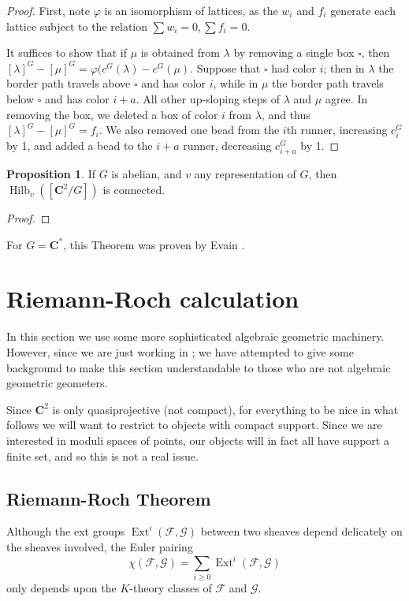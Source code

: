 \documentclass{amsart}[12pt]
\theoremstyle{definition}
\newtheorem{proposition}[dummy]{Proposition}
\newcommand{\C}{\mathbf{C}}
\DeclareMathOperator{\Hilb}{Hilb}
\DeclareMathOperator{\Ext}{Ext}
\begin{document}
\begin{proof}
First, note $\varphi$ is an isomorphism of lattices, as the $w_i$ and $f_i$ generate each lattice subject to the relation $\sum w_i=0, \sum f_i=0$.

It suffices to show that if $\mu$ is obtained from $\lambda$ by removing a single box $\square$, then $[\lambda]^G-[\mu]^G=\varphi(c^G(\lambda)-c^G(\mu)$.  Suppose that $\square$ had color $i$; then in $\lambda$ the border path travels above $\square$ and has color $i$, while in $\mu$ the border path travels below $\square$ and has color $i+a$.  All other up-sloping steps of $\lambda$ and $\mu$ agree.  In removing the box, we deleted a box of color $i$ from $\lambda$, and thus $[\lambda]^G-[\mu]^G=f_i$.  We also removed one bead from the $i$th runner, increasing $c^G_i$ by 1, and added a bead to the $i+a$ runner, decreasing $c^G_{i+a}$ by 1.


\end{proof}


\begin{proposition} \label{prop:connected}
If $G$ is abelian, and $v$ any representation of $G$, then $\Hilb_v([\C^2/G])$ is connected.  
\end{proposition}
\begin{proof}

\end{proof}
For $G=\C^*$, this Theorem was proven by Evain \cite{evain1}.


\section{Riemann-Roch calculation}

In this section we use some more sophisticated algebraic geometric machinery.  However, since we are just working in ; we have attempted to give some background to make this section understandable to those who are not algebraic geometric geometers.

Since $\C^2$ is only quasiprojective (not compact), for everything to be nice in what follows we will want to restrict to objects with compact support.  Since we are interested in moduli spaces of points, our objects will in fact all have support a finite set, and so this is not a real issue.



\subsection{Riemann-Roch Theorem}
Although the ext groups $\Ext^i(\mathcal{F},\mathcal{G})$ between two sheaves depend delicately on the sheaves involved, the Euler pairing
$$\chi(\mathcal{F},\mathcal{G})=\sum_{i\geq 0} \Ext^i(\mathcal{F},\mathcal{G})$$
only depends upon the $K$-theory classes of $\mathcal{F}$ and $\mathcal{G}$.  
\end{document}
